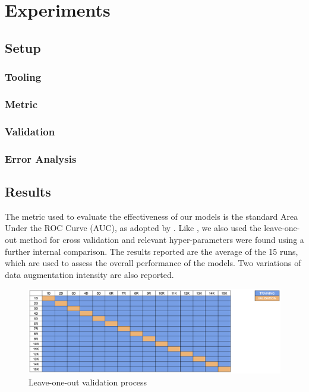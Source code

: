 \chapter{Experiments}

\section{Setup}

\subsection{Tooling}

\subsection{Metric}

\subsection{Validation}

\subsection{Error Analysis}

\section{Results}

The metric used to evaluate the effectiveness of our models is the standard Area Under the ROC Curve (AUC), as adopted by \cite{abs-1807-01631}. Like \cite{CelonaM17}, we also used the leave-one-out method for cross validation and relevant hyper-parameters were found using a further internal comparison. The results reported are the average of the 15 runs, which are used to assess the overall performance of the models. Two variations of data augmentation intensity are also reported.

\begin{figure}[h!tp]
    \centering
    \includegraphics[width=1\textwidth]{imgs/chap4_validation.png}
    \caption{Leave-one-out validation process}
    \label{fig:validation}
\end{figure}


